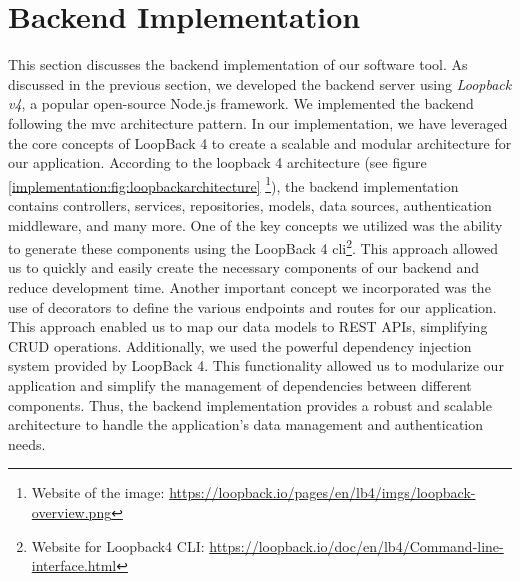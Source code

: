 \section{Backend Implementation}
\label{implementation:section:backend}
This section discusses the backend implementation of our software tool. 
As discussed in the previous section, we developed the backend server using \textit{Loopback v4}, a popular open-source Node.js framework.
We implemented the backend following the \ac{mvc} architecture pattern. 
In our implementation, we have leveraged the core concepts of LoopBack 4 to create a scalable and modular architecture for our application.
According to the loopback 4 architecture (see figure \ref{implementation:fig:loopbackarchitecture} \footnote{Website of the image: \url{https://loopback.io/pages/en/lb4/imgs/loopback-overview.png}}), the backend implementation contains controllers, services, repositories, models, data sources, authentication middleware, and many more.
One of the key concepts we utilized was the ability to generate these components using the LoopBack 4 \ac{cli}\footnote{Website for Loopback4 CLI: \url{https://loopback.io/doc/en/lb4/Command-line-interface.html}}.
This approach allowed us to quickly and easily create the necessary components of our backend and reduce development time.
Another important concept we incorporated was the use of decorators to define the various endpoints and routes for our application. 
This approach enabled us to map our data models to REST APIs, simplifying CRUD operations.
Additionally, we used the powerful dependency injection system provided by LoopBack 4. 
This functionality allowed us to modularize our application and simplify the management of dependencies between different components.
Thus, the backend implementation provides a robust and scalable architecture to handle the application's data management and authentication needs.
